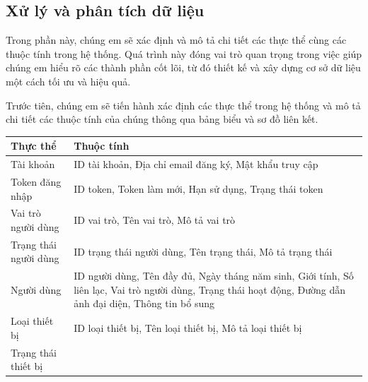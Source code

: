 \subsection{Xử lý và phân tích dữ liệu}

Trong phần này, chúng em sẽ xác định và mô tả chi tiết các thực thể cùng các thuộc tính trong hệ thống.
Quá trình này đóng vai trò quan trọng trong việc giúp chúng em hiểu rõ các thành phần cốt lõi, từ đó thiết kế và xây dựng cơ sở dữ liệu một cách tối ưu và hiệu quả.

Trước tiên, chúng em sẽ tiến hành xác định các thực thể trong hệ thống và mô tả chi tiết các thuộc tính của chúng thông qua bảng biểu và sơ đồ liên kết.

\begin{table}[H]
	\raggedright
	\begin{tabularx}{\textwidth}{|p{4.5cm}|X|}
		\hline
		\bfseries Thực thể               & \bfseries Thuộc tính                                                                                                     \\ \hline
		Tài khoản                        &
		ID tài khoản, Địa chỉ email đăng ký, Mật khẩu truy cập                                                                                                      \\
		\hline
		Token đăng nhập                  &
		ID token, Token làm mới, Hạn sử dụng, Trạng thái token                                                                                                      \\
		\hline
		Vai trò người dùng               &
		ID vai trò, Tên vai trò, Mô tả vai trò                                                                                                                      \\
		\hline
		Trạng thái người dùng            &
		ID trạng thái người dùng, Tên trạng thái, Mô tả trạng thái                                                                                                  \\
		\hline
		Người dùng                       &
		ID người dùng, Tên đầy đủ, Ngày tháng năm sinh, Giới tính, Số liên lạc, Vai trò người dùng, Trạng thái hoạt động, Đường dẫn ảnh đại diện, Thông tin bổ sung \\
		\hline
		Loại thiết bị                    &
		ID loại thiết bị, Tên loại thiết bị, Mô tả loại thiết bị                                                                                                    \\
		\hline
		Trạng thái thiết bị              &

\end{tabularx}
\end{table}
